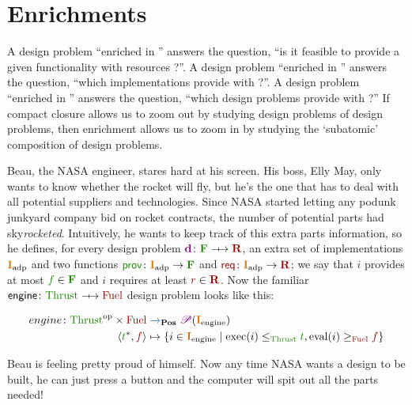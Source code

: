 
\section{Enrichments}
\label{sec:enriched}


A design problem ``enriched in \Bool'' answers the question, ``is it feasible to provide a given functionality \fun with resources \res?''.
A design problem ``enriched in \Set'' answers the question, ``which implementations provide \fun with \res?''.
A design problem ``enriched in \DP'' answers the question, ``which design problems provide \fun with \res?'' If compact closure allows us to zoom out by studying design problems of design problems, then enrichment allows us to zoom in by studying the `subatomic' composition of design problems.

\begin{example}
    \label{ex:dpi_example}
    Beau, the NASA engineer, stares hard at his screen.
    His boss, Elly May, only wants to know whether the rocket will fly, but he's the one that has to deal with all potential suppliers and technologies.
    Since NASA started letting any podunk junkyard company bid on rocket contracts, the number of potential parts had sky\emph{rocketed}.
    Intuitively, he wants to keep track of this extra parts information, so he defines, for every design problem $\adp \colon \funsp \profto \ressp$, an extra set of implementations $\impsp_\text{adp}$ and two functions $\prov\colon \impsp_\text{adp} \to \funsp$ and  $\req\colon \impsp_\text{adp} \to \ressp$; we say that $i$ provides at most $\fun \in \funsp$ and $i$ requires at least $\res \in \ressp$.
    Now the familiar $\mathsf{engine} \colon \F{\text{Thrust}} \profto \R{\text{Fuel}}$ design problem looks like this:
    \begin{widepar}
        \begin{equation*}
            \begin{aligned}
                engine \colon \textF{Thrust}\op \cartprod \textR{Fuel} & \toinPos \powerset(\impsp_\text{engine})                                                                                             \\
                \tup{\F{t}^*,\R{f}}                                    & \mapsto \{ i \in \impsp_\text{engine} \mid \text{exec}(i) \leq_\F{\text{Thrust}} \F{t}, \text{eval}(i) \geq_\R{\text{Fuel}} \R{f} \} 
            \end{aligned}
        \end{equation*}
    \end{widepar}
    Beau is feeling pretty proud of himself.
    Now any time NASA wants a design to be built, he can just press a button and the computer will spit out all the parts needed!
\end{example}

